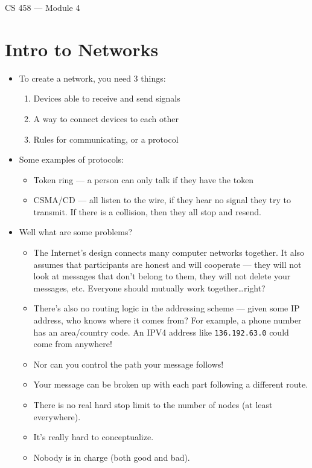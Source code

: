 \documentclass{article}
\author{Clement Tsang}
\begin{document}
\begin{center}
    \Large{CS 458 --- Module 4}
\end{center}

\section{Intro to Networks}
\begin{itemize}
    \item To create a network, you need 3 things:
        \begin{enumerate}
            \item Devices able to receive and send signals
            \item A way to connect devices to each other
            \item Rules for communicating, or a protocol
        \end{enumerate}
    \item Some examples of protocols:
        \begin{itemize}
            \item Token ring --- a person can only talk if they have the token
            \item CSMA/CD --- all listen to the wire, if they hear no signal they try to transmit.  If there is a collision, then they all stop and resend.
        \end{itemize}
    \item Well what are some problems?
        \begin{itemize}
            \item The Internet's design connects many computer networks together.  It also assumes that participants are honest and will cooperate --- they will not look at messages that don't belong to them, they will not delete your messages, etc.  Everyone should mutually work together\dots right?
            \item There's also no routing logic in the addressing scheme --- given some IP address, who knows where it comes from?  For example, a phone number has an area/country code.  An IPV4 address like \lstinline{136.192.63.0} could come from anywhere!
            \item Nor can you control the path your message follows!
            \item Your message can be broken up with each part following a different route.
            \item There is no real hard stop limit to the number of nodes (at least everywhere).
            \item It's really hard to conceptualize.
            \item Nobody is in charge (both good and bad).
        \end{itemize}
\end{itemize}
\end{document}
